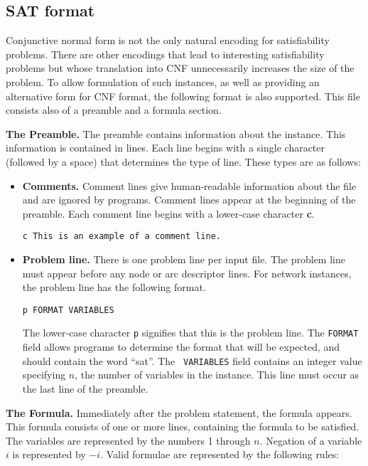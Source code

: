 \subsection{SAT format}

Conjunctive normal form is not the only natural encoding for
satisfiability problems.  There are other encodings that lead to
interesting satisfiability problems but whose translation into CNF
unnecessarily increases the size of the problem.  To allow formulation
of such instances, as well as providing an alternative form for CNF
format, the following format is also supported.  This file consists
also of a preamble and a formula section.

{\bf The Preamble.} The preamble contains information about the
instance.  This information is contained in lines.  Each line begins
with a single character (followed by a space) that determines the type
of line.  These types are as follows:

\begin{itemize}

\item {\bf Comments.} Comment lines give human-readable 
information about the file and are ignored by programs.  Comment lines
appear at the beginning of the preamble.  Each comment line begins with a
lower-case character {\bf c}.
\begin{verbatim} 
c This is an example of a comment line.
\end{verbatim} 

\item {\bf Problem line.}  There is one problem line per input file.  The 
problem line must appear before any node or arc descriptor lines.  For
network instances, the problem line has the following format.
\begin{verbatim}
p FORMAT VARIABLES 
\end{verbatim} 

The lower-case character {\tt p} signifies that this is the problem
line.  The {\tt FORMAT} field allows programs to determine the format
that will be expected, and should contain the word ``sat''.  The {\tt
VARIABLES} field contains an integer value specifying $n$, the number
of variables in the instance.  This line must occur as the last line
of the preamble.

\end{itemize}

{\bf The Formula.}  Immediately after the problem statement, the
formula appears.  This formula consists of one or more lines,
containing the formula to be satisfied.  The variables are represented
by the numbers 1 through $n$.  Negation of a variable $i$ is represented
by $-i$.  Valid formulae are represented by the following rules:

